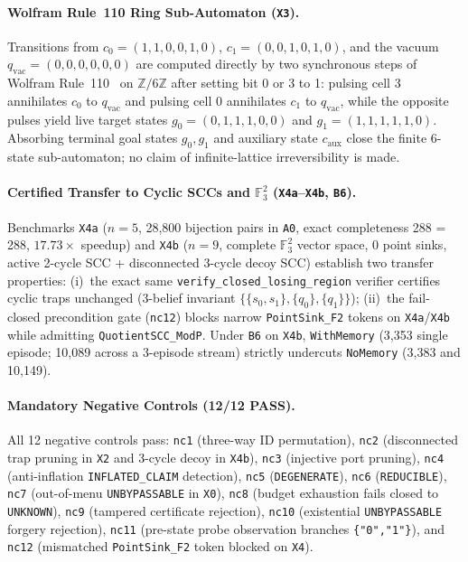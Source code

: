 \documentclass[10pt,a4paper]{article}
\newcommand{\code}[1]{\nolinkurl{#1}}
\begin{document}
\paragraph{Wolfram Rule~110 Ring Sub-Automaton (\code{X3}).}
Transitions from $c_0 = (1,1,0,0,1,0)$, $c_1 = (0,0,1,0,1,0)$, and the vacuum $q_{\mathrm{vac}} = (0,0,0,0,0,0)$ are computed directly by two synchronous steps of Wolfram Rule~110~\cite{wolfram1983,cook2004} on $\mathbb{Z}/6\mathbb{Z}$ after setting bit 0 or 3 to 1: pulsing cell 3 annihilates $c_0$ to $q_{\mathrm{vac}}$ and pulsing cell 0 annihilates $c_1$ to $q_{\mathrm{vac}}$, while the opposite pulses yield live target states $g_0 = (0,1,1,1,0,0)$ and $g_1 = (1,1,1,1,1,0)$. Absorbing terminal goal states $g_0, g_1$ and auxiliary state $c_{\mathrm{aux}}$ close the finite 6-state sub-automaton; no claim of infinite-lattice irreversibility is made.

\paragraph{Certified Transfer to Cyclic SCCs and $\mathbb{F}_3^2$ (\texttt{X4a}--\texttt{X4b}, \code{B6}).}
Benchmarks \code{X4a} ($n=5$, 28,800 bijection pairs in \code{A0}, exact completeness 288 = 288, $17.73\times$ speedup) and \code{X4b} ($n=9$, complete $\mathbb{F}_3^2$ vector space, 0 point sinks, active 2-cycle SCC + disconnected 3-cycle decoy SCC) establish two transfer properties: (i)~the exact same \code{verify_closed_losing_region} verifier certifies cyclic traps unchanged (3-belief invariant $\{\{s_0,s_1\}, \{q_0\}, \{q_1\}\}$); (ii)~the fail-closed precondition gate (\code{nc12}) blocks narrow \code{PointSink_F2} tokens on \code{X4a}/\code{X4b} while admitting \code{QuotientSCC_ModP}. Under \code{B6} on \code{X4b}, \code{WithMemory} (3,353 single episode; 10,089 across a 3-episode stream) strictly undercuts \code{NoMemory} (3,383 and 10,149).

\paragraph{Mandatory Negative Controls (12/12 PASS).}
All 12 negative controls pass: \code{nc1} (three-way ID permutation), \code{nc2} (disconnected trap pruning in \code{X2} and 3-cycle decoy in \code{X4b}), \code{nc3} (injective port pruning), \code{nc4} (anti-inflation \code{INFLATED_CLAIM} detection), \code{nc5} (\code{DEGENERATE}), \code{nc6} (\code{REDUCIBLE}), \code{nc7} (out-of-menu \code{UNBYPASSABLE} in \code{X0}), \code{nc8} (budget exhaustion fails closed to \code{UNKNOWN}), \code{nc9} (tampered certificate rejection), \code{nc10} (existential \code{UNBYPASSABLE} forgery rejection), \code{nc11} (pre-state probe observation branches \texttt{\{"0","1"\}}), and \code{nc12} (mismatched \code{PointSink_F2} token blocked on \code{X4}).
\end{document}
